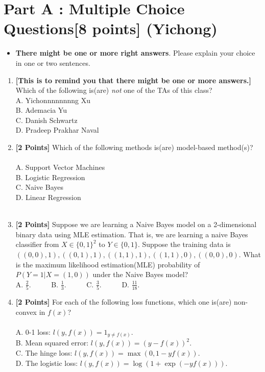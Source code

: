 \documentclass{article}
\begin{document}
\newpage


\section*{Part A : Multiple Choice Questions[8 points] (Yichong)}

\begin{itemize}
	\item \textbf{There might be one or more right answers}. Please explain your choice in one or two sentences.
\end{itemize}

\vspace {2mm}

\begin{enumerate}

		\item \textbf{[This is to remind you that there might be one or more answers.]} Which of the following is(are) \emph{not} one of the TAs of this class?\\
		A. Yichonnnnnnnng Xu\\
		B. Ademacia Yu\\
		C. Danish Schwartz\\
		D. Pradeep Prakhar Naval\\

		\item \textbf{[2 Points]} Which of the following methods is(are) model-based method(s)? \\ \\
		A. Support Vector Machines \\
		B. Logistic Regression\\
		C. Naive Bayes\\
		D. Linear Regression\\
		\\

		\item \textbf{[2 Points]} Suppose we are learning a Naive Bayes model on a 2-dimensional binary data using MLE estimation. That is, we are learning a naive Bayes classifier from $X\in \{0,1\}^2$ to $Y\in \{0,1\}$. Suppose the training data is $((0,0),1), ((0,1),1),((1,1),1),((1,1),0),((0,0),0)$. What is the maximum likelihood estimation(MLE) probability of $P(Y=1|X=(1,0))$ under the Naive Bayes model?\\
		A. $\frac{2}{5}$. \ \ \ \ \  B. $\frac{1}{3}$. \ \ \ \ \  C. $\frac{3}{5}$. \ \ \ \ \ D. $\frac{11}{18}$.
		\\

		\item \textbf{[2 Points]} For each of the following loss functions, which one is(are) non-convex in $f(x)$? \\ \\
		A. 0-1 loss: $l(y,f(x))=1_{y\ne f(x)}$. \\
		B. Mean squared error: $l(y,f(x))=(y-f(x))^2$.  \\
		C. The hinge loss: $l(y,f(x))=\max(0,1-yf(x))$. \\
		D. The logistic loss: $l(y,f(x))=\log(1+\exp(-yf(x)))$. \\
		\\
		

\end{enumerate}
\end{document}
